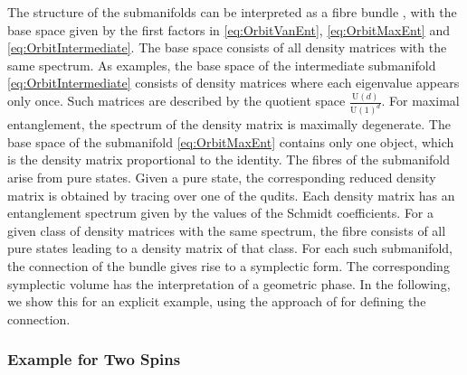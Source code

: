\documentclass[a4paper,11pt]{article}
\newcommand{\U}{\text{U}}
\newcommand{\1}{\mathds{1}}
\begin{document}
The structure of the submanifolds can be interpreted as a fibre bundle \cite{Sinolecka2002manifolds}, with the base space given by the first factors in \eqref{eq:OrbitVanEnt}, \eqref{eq:OrbitMaxEnt} and \eqref{eq:OrbitIntermediate}. The base space consists of all density matrices with the same spectrum. As examples, the base space of the intermediate submanifold \eqref{eq:OrbitIntermediate} consists of density matrices where each eigenvalue appears only once. Such matrices are described by the quotient space $\frac{\U(d)}{\U(1)^d}$. For maximal entanglement, the spectrum of the density matrix is maximally degenerate. The base space of the submanifold \eqref{eq:OrbitMaxEnt} contains only one object, which is the density matrix proportional to the identity.
The fibres of the submanifold arise from pure states. Given a pure state, the corresponding reduced density matrix is obtained by tracing over one of the qudits. Each density matrix has an entanglement spectrum given by the values of the Schmidt coefficients. For a given class of density matrices with the same spectrum, the fibre consists of all pure states leading to a density matrix of that class. For each such submanifold, the connection of the bundle gives rise to a symplectic form. The corresponding symplectic volume has the interpretation of a geometric phase. In the following, we show this for an explicit example, using the approach of \cite{Bengtsson:2001yd} for defining the connection.

\subsubsection{Example for Two Spins}
\label{sec:TwoSpins}
\end{document}
